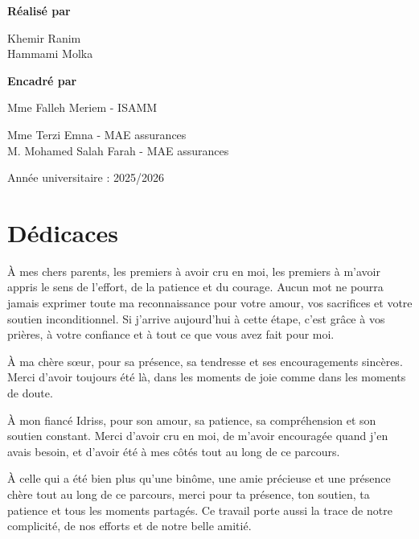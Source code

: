 \documentclass[12pt,a4paper,oneside]{report}
\begin{document}
\begin{titlepage}
\begin{center}
\vspace{0.5cm}

{\bfseries\large Réalisé par}

\vspace{0.35cm}

{\normalsize Khemir Ranim \\ Hammami Molka}

\vspace{0.5cm}

{\bfseries\large Encadré par}

\vspace{0.35cm}

{\normalsize Mme Falleh Meriem - ISAMM}

\vspace{0.2cm}

{\normalsize Mme Terzi Emna - MAE assurances \\M. Mohamed Salah Farah - MAE assurances}

\vfill
\vspace{0.8cm}

{\normalsize Année universitaire : 2025/2026}

\end{center}
\end{titlepage}

\chapter*{Dédicaces}

À mes chers parents,  
les premiers à avoir cru en moi, les premiers à m’avoir appris le sens de l’effort, de la patience et du courage.  
Aucun mot ne pourra jamais exprimer toute ma reconnaissance pour votre amour, vos sacrifices et votre soutien inconditionnel.  
Si j’arrive aujourd’hui à cette étape, c’est grâce à vos prières, à votre confiance et à tout ce que vous avez fait pour moi.

À ma chère sœur,  
pour sa présence, sa tendresse et ses encouragements sincères.  
Merci d’avoir toujours été là, dans les moments de joie comme dans les moments de doute.

À mon fiancé Idriss,  
pour son amour, sa patience, sa compréhension et son soutien constant.  
Merci d’avoir cru en moi, de m’avoir encouragée quand j’en avais besoin, et d’avoir été à mes côtés tout au long de ce parcours.

À celle qui a été bien plus qu’une binôme, une amie précieuse et une présence chère tout au long de ce parcours,  
merci pour ta présence, ton soutien, ta patience et tous les moments partagés.  
Ce travail porte aussi la trace de notre complicité, de nos efforts et de notre belle amitié.
\end{document}
